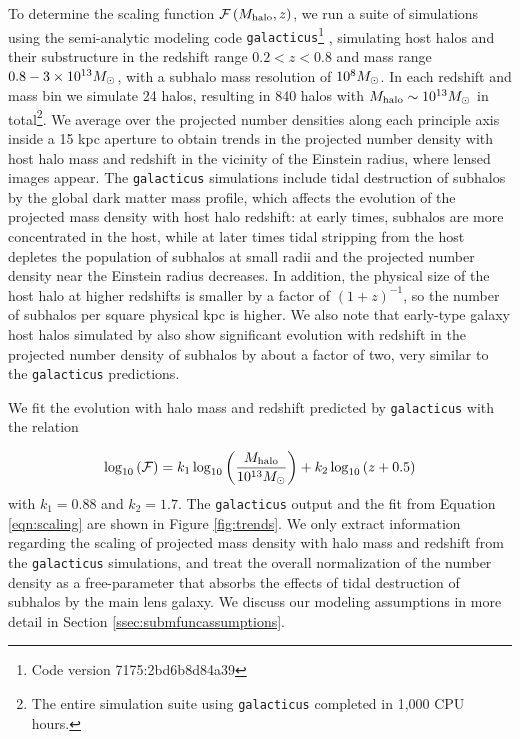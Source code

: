 To determine the scaling function $\mathcal{F} \left(M_{\rm{halo}}, z\right)$, we run a suite of simulations using the semi-analytic modeling code {\tt{galacticus}}\footnote{Code version 7175:2bd6b8d84a39} \cite{Benson12,Pullen++14}, simulating host halos and their substructure in the redshift range $0.2 < z < 0.8$ and mass range $0.8 - 3 \times 10^{13} {M_{\odot}}$, with a subhalo mass resolution of $10^8 {M_{\odot}}$. In each redshift and mass bin we simulate 24 halos, resulting in 840 halos with $M_{\rm{halo}} \sim 10^{13} {M_{\odot}}$ in total\footnote{The entire simulation suite using {\tt{galacticus}} completed in 1,000 CPU hours.}. We average over the projected number densities along each principle axis inside a 15 kpc aperture to obtain trends in the projected number density with host halo mass and redshift in the vicinity of the Einstein radius, where lensed images appear. The {\tt{galacticus}} simulations include tidal destruction of subhalos by the global dark matter mass profile, which affects the evolution of the projected mass density with host halo redshift: at early times, subhalos are more concentrated in the host, while at later times tidal stripping from the host depletes the population of subhalos at small radii and the projected number density near the Einstein radius decreases. In addition, the physical size of the host halo at higher redshifts is smaller by a factor of $\left(1+z\right)^{-1}$, so the number of subhalos per square physical kpc is higher. We also note that early-type galaxy host halos simulated by \cite{Fiacconi++16} also show significant evolution with redshift in the projected number density of subhalos by about a factor of two, very similar to the {\tt{galacticus}} predictions. 

We fit the evolution with halo mass and redshift predicted by {\tt{galacticus}} with the relation

\begin{equation}
\label{eqn:scaling}
\log_{10} \left(\mathcal{F}\right) = k_1 \log_{10} \left(\frac{M_{\rm{halo}}}{10^{13} {M_{\odot}}}\right) + k_2 \log_{10}\left(z+0.5\right)
\end{equation}
with $k_1 = 0.88$ and $k_2 = 1.7$. The {\tt{galacticus}} output and the fit from Equation \ref{eqn:scaling} are shown in Figure \ref{fig:trends}. We only extract information regarding the scaling of projected mass density with halo mass and redshift from the {\tt{galacticus}} simulations, and treat the overall normalization of the number density as a free-parameter that absorbs the effects of tidal destruction of subhalos by the main lens galaxy. We discuss our modeling assumptions in more detail in Section \ref{ssec:submfuncassumptions}.  

